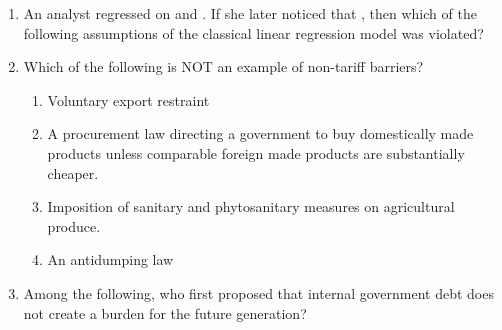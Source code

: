 \documentclass[12pt]{article}
\theoremstyle{remark}
\begin{document}
\begin{enumerate}
\begin{enumerate}
 \end{enumerate}
\hfill{}
\item  An analyst regressed  on  and . If she later noticed that , then which of the following assumptions of the classical linear regression model was violated? 
\begin{enumerate}  \end{enumerate}
\hfill{}
\item  Which of the following is NOT an example of non-tariff barriers? \begin{enumerate} 
\item  Voluntary export restraint 
\item  A procurement law directing a government to buy domestically made products unless comparable foreign made products are substantially cheaper. 
\item  Imposition of sanitary and phytosanitary measures on agricultural produce. 
\item  An antidumping law 
\end{enumerate}
\hfill{}
\item Among the following, who first proposed that internal government debt does not create a burden for the future generation? 
\begin{enumerate}  \end{enumerate}
\hfill{}


\end{enumerate}
\end{document}
